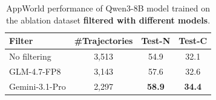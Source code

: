 \begin{table}[t]
\centering
\small
\setlength{\tabcolsep}{3pt}
\begin{tabular*}{0.5\linewidth}{@{\extracolsep{\fill}}lccc@{}}
\toprule
\textbf{Filter} & \textbf{\#Trajectories} & \textbf{Test-N} & \textbf{Test-C} \\
\midrule
No filtering & 3,513 & 54.9 & 32.1\\
\midrule
GLM-4.7-FP8 & 3,143 & 57.6 & 32.6 \\ 
\midrule
Gemini-3.1-Pro & 2,297 & \textbf{58.9} & \textbf{34.4} \\
\bottomrule
\end{tabular*}
\caption{AppWorld performance of Qwen3-8B model trained on the ablation dataset \textbf{filtered with different models}.}
\label{tab:trajectory_filtering}
\end{table}




